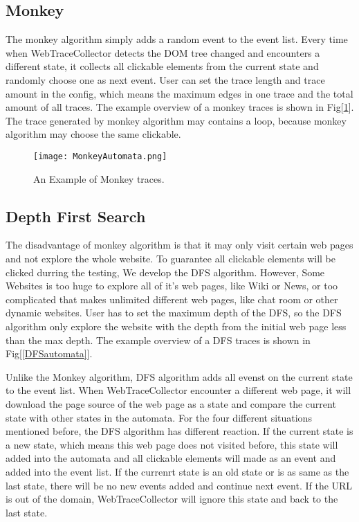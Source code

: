 
\subsection{Monkey}

The monkey algorithm simply adds a random event to the event list.
Every time when WebTraceCollector detects the DOM tree changed and encounters a different state,
it collects all clickable elements from the current state and randomly choose one as next event.
User can set the trace length and trace amount in the config,
which means the maximum edges in one trace and the total amount of all traces.
The example overview of a monkey traces is shown in Fig[\ref{MonkeyAutomata}].
The trace generated by monkey algorithm may contains a loop, 
because monkey algorithm may choose the same clickable.

\begin{figure}[h]
	\graphicspath{{pic/}}
	\begin{center}
		\texttt{[image: MonkeyAutomata.png]}
	\end{center}
	\caption{An Example of Monkey traces. }
	\label{MonkeyAutomata}
\end{figure}


\subsection{Depth First Search}

The disadvantage of monkey algorithm is that it may only visit certain web pages and not explore the whole website.
To guarantee all clickable elements will be clicked durring the testing,
We develop the DFS algorithm.
However, Some Websites is too huge to explore all of it's web pages, like Wiki or News,
or too complicated that makes unlimited different web pages, like chat room or other dynamic websites. 
User has to set the maximum depth of the DFS,
so the DFS algorithm only explore the website with the depth from the initial web page less than the max depth.
The example overview of a DFS traces is shown in Fig[\ref{DFSautomata}].

Unlike the Monkey algorithm, DFS algorithm adds all evenst on the current state to the event list.
When WebTraceCollector encounter a different web page,
it will download the page source of the web page as a state and compare the current state with other states in the automata.
For the four different situations mentioned before,
the DFS algorithm has different reaction.
If the current state is a new state, which means this web page does not visited before,
this state will added into the automata and all clickable elements will made as an event and added into the event list.
If the currenrt state is an old state or is as same as the last state,
there will be no new events added and continue next event.
If the URL is out of the domain, WebTraceCollector will ignore this state and back to the last state.

